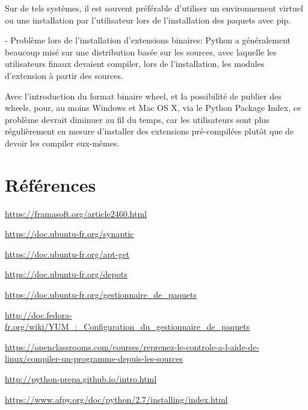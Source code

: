 \documentclass[a4paper,12pt]{article}
\begin{document}
Sur de tels systèmes, il est souvent préférable d’utiliser un environnement virtuel ou une installation par l’utilisateur lors de l’installation des paquets avec pip.

- Problème lors de l'installation d'extensions binaires:
Python a généralement beaucoup misé sur une distribution basée sur les sources, avec laquelle les utilisateurs finaux devaient compiler, lors de l’installation, les modules d’extension à partir des sources.

Avec l’introduction du format binaire wheel, et la possibilité de publier des wheels, pour, au moins Windows et Mac OS X, via le Python Package Index, ce problème devrait diminuer au fil du temps, car les utilisateurs sont plus régulièrement en mesure d’installer des extensions pré-compilées plutôt que de devoir les compiler eux-mêmes.

\clearpage
\section{Références}

\url{https://framasoft.org/article2460.html}

\url{https://doc.ubuntu-fr.org/synaptic}

\url{https://doc.ubuntu-fr.org/apt-get}

\url{https://doc.ubuntu-fr.org/depots}

\url{https://doc.ubuntu-fr.org/gestionnaire_de_paquets}

\url{http://doc.fedora-fr.org/wiki/YUM_:_Configuration_du_gestionnaire_de_paquets}

\url{https://openclassrooms.com/courses/reprenez-le-controle-a-l-aide-de-linux/compiler-un-programme-depuis-les-sources}

\url{http://python-prepa.github.io/intro.html}

\url{https://www.afpy.org/doc/python/2.7/installing/index.html}
\end{document}
